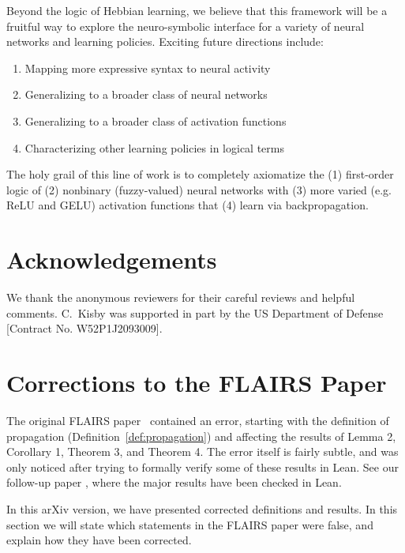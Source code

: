 \documentclass[letterpaper]{article}
\theoremstyle{definition}
\begin{document}
Beyond the logic of Hebbian learning, we believe that this framework will be a fruitful way to explore the neuro-symbolic interface for a variety of neural networks and learning policies.  Exciting future directions include:
\begin{enumerate}[itemsep=-1pt, topsep=2pt]
    \item Mapping more expressive syntax to neural activity
    \item Generalizing to a broader class of neural networks
    \item Generalizing to a broader class of activation functions
    \item Characterizing other learning policies in logical terms
\end{enumerate}
The holy grail of this line of work is to completely axiomatize the (1) first-order logic of (2) nonbinary (fuzzy-valued) neural networks with (3) more varied (e.g. ReLU and GELU) activation functions that (4) learn via backpropagation.

\section{Acknowledgements}
We thank the anonymous reviewers for their careful reviews and helpful comments.  C.~Kisby was supported in part by the US Department of Defense [Contract No. W52P1J2093009].

\section{Corrections to the FLAIRS Paper}
The original FLAIRS paper~\citep{kisby2022logic} contained an error, starting with the definition of propagation (Definition~\ref{def:propagation}) and affecting the results of Lemma 2, Corollary 1, Theorem 3, and Theorem 4. The error itself is fairly subtle, and was only noticed after trying to formally verify some of these results in Lean. See our follow-up paper \citep{kisby2024hebbian}, where the major results have been checked in Lean.

In this arXiv version, we have presented corrected definitions and results. In this section we will state which statements in the FLAIRS paper were false, and explain how they have been corrected.
\end{document}
